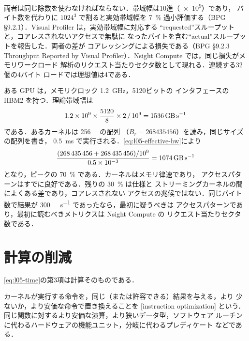 \documentclass[../main.tex]{subfiles}
\begin{document}
両者は同じ除数を使わなければならない．帯域幅は10進（\num{e9}）であり，
バイト数を代わりに $1024^3$ で割ると実効帯域幅を \SI{7}{\percent}
過小評価する（BPG §9.2.1）．Visual Profiler は，実効帯域幅に対応する
\enquote{requested}スループットと，コアレスされないアクセスで無駄に
なったバイトを含む\enquote{actual}スループットを報告した．両者の差が
コアレッシングによる損失である（BPG §9.2.3 Throughput Reported by
Visual Profiler）．Nsight Compute では，同じ損失がメモリワークロード
解析のリクエスト当たりセクタ数として現れる．連続する32個の4バイト
ロードでは理想値は4である．

\begin{example}[帯域幅の利用率]
  \label{ex:l05-bandwidth}
  ある GPU は，メモリクロック \SI{1.2}{\giga\hertz}，5120ビットの
  インタフェースの HBM2 を持つ．理論帯域幅は
  \[
    1.2 \times 10^9 \times \frac{5120}{8} \times 2 \,/\, 10^9
    = \SI{1536}{\giga\byte\per\second}
  \]
  である．あるカーネルは \SI{256}{\mebi\byte} の配列
  （$B_r = \num{268435456}$）を読み，同じサイズの配列を書き，
  \SI{0.5}{\milli\second} で実行される．\cref{eq:l05-effective-bw}により
  \[
    \frac{(\num{268435456} + \num{268435456})/10^9}{0.5 \times 10^{-3}}
    = \SI{1074}{\giga\byte\per\second}
  \]
  となり，ピークの \SI{70}{\percent} である．カーネルはメモリ律速であり，
  アクセスパターンはすでに良好である．残りの \SI{30}{\percent} は仕様と
  ストリーミングカーネルの間によくある差であり，コアレスされない
  アクセスの兆候ではない．同じバイト数で結果が
  \SI{300}{\giga\byte\per\second} であったなら，最初に疑うべきは
  アクセスパターンであり，最初に読むべきメトリクスは Nsight Compute の
  リクエスト当たりセクタ数である．
\end{example}

\section{計算の削減}
\label{sec:l05-compute}

\cref{eq:l05-time}の第3項は計算そのものである．

\begin{definition}[命令最適化]
  カーネルが実行する命令を，同じ（または許容できる）結果を与える，より
  少ないか，より安価な命令で置き換えることを
  [instruction optimization]
  という．同じ関数に対するより安価な演算，より狭いデータ型，ソフトウェア
  ルーチンに代わるハードウェアの機能ユニット，分岐に代わるプレディケート
  などである．
\end{definition}
\end{document}
